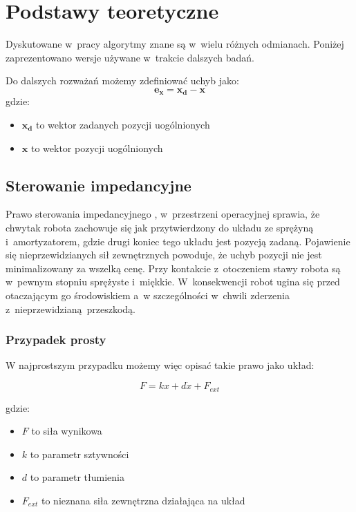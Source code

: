 
\chapter{Podstawy teoretyczne\label{chap:przeglad_literatury}}
Dyskutowane w~pracy algorytmy znane są w~wielu różnych odmianach. Poniżej zaprezentowano wersje używane w~trakcie dalszych badań. 

Do dalszych rozważań możemy zdefiniować uchyb jako:
\begin{equation}
	\boldsymbol{e_x} = \boldsymbol{x_d} - \boldsymbol{x}
\end{equation}
gdzie:
\begin{itemize}
\item $\boldsymbol{x_d}$ to wektor zadanych pozycji uogólnionych
\item $\boldsymbol{x}$ to wektor pozycji uogólnionych
\end{itemize}

\section{Sterowanie impedancyjne}
Prawo sterowania impedancyjnego \cite{bib:impedance}, \cite{wiki:Impedance_control} w~przestrzeni operacyjnej sprawia, że chwytak robota zachowuje się jak przytwierdzony do układu ze sprężyną i~amortyzatorem, gdzie drugi koniec tego układu jest pozycją zadaną. Pojawienie się nieprzewidzianych sił zewnętrznych powoduje, że uchyb pozycji nie jest minimalizowany za wszelką cenę. Przy kontakcie z~otoczeniem stawy robota są w~pewnym stopniu sprężyste i~miękkie. W~konsekwencji robot ugina się przed otaczającym go środowiskiem a~w szczególności w~chwili zderzenia z~nieprzewidzianą przeszkodą. 

\subsection{Przypadek prosty}
W najprostszym przypadku możemy więc opisać takie prawo jako układ: 

	\begin{equation}
	F = kx + d\dot{x} + F_{ext}
	\end{equation}

gdzie:
\begin{itemize}
\item $F$ to siła wynikowa
\item $k$ to parametr sztywności
\item $d$ to parametr tłumienia
\item $F_{ext}$ to nieznana siła zewnętrzna działająca na układ
\end{itemize} 

